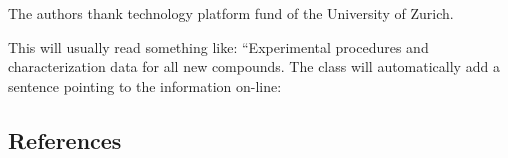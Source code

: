 \documentclass[journal=jacsat,manuscript=article]{achemso}
\begin{document}
\begin{acknowledgement}

The authors thank technology platform fund of the University of Zurich.


\end{acknowledgement}

\begin{suppinfo}

This will usually read something like: ``Experimental procedures and
characterization data for all new compounds. The class will
automatically add a sentence pointing to the information on-line:

\end{suppinfo}

\hypertarget{references}{%
\subsection{References}\label{references}}
\end{document}
